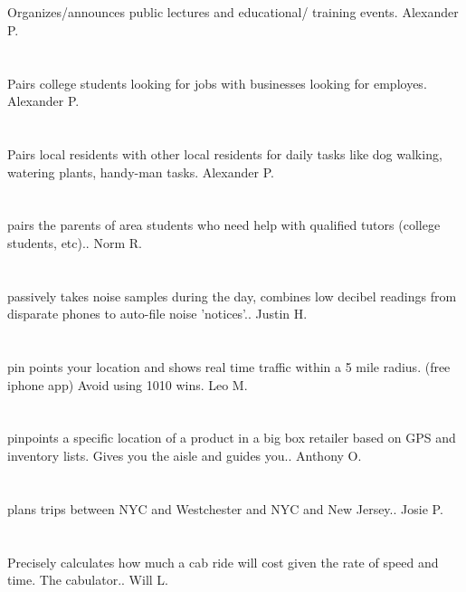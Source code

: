 \section{}Organizes/announces public lectures and educational/ training events. Alexander P.
\section{}Pairs college students looking for jobs with businesses looking for employes. Alexander P.
\section{}Pairs local residents with other local residents for daily tasks like dog walking,  watering plants,  handy-man tasks. Alexander P.
\section{}pairs the parents of area students who need help with qualified tutors (college students,  etc).. Norm R.
\section{}passively takes noise samples during the day,  combines low decibel readings from disparate phones to auto-file noise 'notices'.. Justin H.
\section{} pin points your location and shows real time traffic within a 5 mile radius.  (free iphone app) Avoid using 1010 wins. Leo M.
\section{}pinpoints a specific location of a product in a big box retailer based on GPS and inventory lists.  Gives you the aisle and guides you.. Anthony O.
\section{} plans trips between NYC and Westchester and NYC and New Jersey.. Josie P.
\section{}Precisely calculates how much a cab ride will cost given the rate of speed and time. The cabulator.. Will L.
